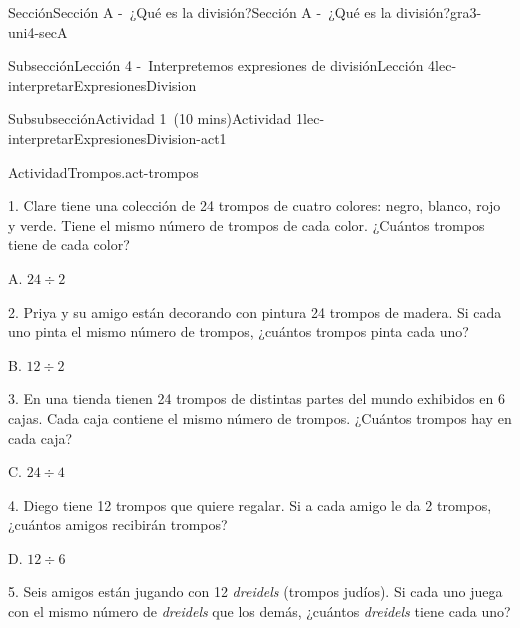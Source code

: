 \documentclass[oneside,10pt,]{article}
\begin{document}
\begin{sectionptx}{Sección}{Sección A -~¿Qué es la división?}{}{Sección A -~¿Qué es la división?}{}{}{gra3-uni4-secA}
\begin{subsectionptx}{Subsección}{Lección 4 -~Interpretemos expresiones de división}{}{Lección 4}{}{}{lec-interpretarExpresionesDivision}
\begin{subsubsectionptx}{Subsubsección}{Actividad 1~(10 mins)}{}{Actividad 1}{}{}{lec-interpretarExpresionesDivision-act1}
\begin{activity}{Actividad}{Trompos.}{act-trompos}
\begin{sidebyside}{2}{0.05}{0}{0.15}
\begin{sbspanel}{0.6}
1. Clare tiene una colección de 24 trompos de cuatro colores: negro, blanco, rojo y verde. Tiene el mismo número de trompos de cada color. ¿Cuántos trompos tiene de cada color?%
\end{sbspanel}%
\begin{sbspanel}{0.2}%
\par
A. \(24 \div 2\)%
\end{sbspanel}%
\end{sidebyside}%
\begin{sidebyside}{2}{0.05}{0}{0.15}%
\begin{sbspanel}{0.6}%
2. Priya y su amigo están decorando con pintura 24 trompos de madera. Si cada uno pinta el mismo número de trompos, ¿cuántos trompos pinta cada uno?%
\end{sbspanel}%
\begin{sbspanel}{0.2}%
\par
B. \(12 \div 2\)%
\end{sbspanel}%
\end{sidebyside}%
\begin{sidebyside}{2}{0.05}{0}{0.15}%
\begin{sbspanel}{0.6}%
3. En una tienda tienen 24 trompos de distintas partes del mundo exhibidos en 6 cajas. Cada caja contiene el mismo número de trompos. ¿Cuántos trompos hay en cada caja?%
\end{sbspanel}%
\begin{sbspanel}{0.2}%
\par
C. \(24 \div 4\)%
\end{sbspanel}%
\end{sidebyside}%
\begin{sidebyside}{2}{0.05}{0}{0.15}%
\begin{sbspanel}{0.6}%
4. Diego tiene 12 trompos que quiere regalar. Si a cada amigo le da 2 trompos, ¿cuántos amigos recibirán trompos?%
\end{sbspanel}%
\begin{sbspanel}{0.2}%
\par
D. \(12 \div 6\)%
\end{sbspanel}%
\end{sidebyside}%
\begin{sidebyside}{2}{0.05}{0}{0.15}%
\begin{sbspanel}{0.6}%
5. Seis amigos están jugando con 12 \emph{dreidels} (trompos judíos). Si cada uno juega con el mismo número de \emph{dreidels} que los demás, ¿cuántos \emph{dreidels} tiene cada uno?%
\end{sbspanel}%

\end{sidebyside}
\end{activity}
\end{subsubsectionptx}
\end{subsectionptx}
\end{sectionptx}
\end{document}
